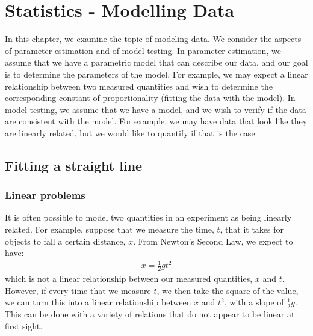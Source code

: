 %
\chapter{Statistics - Modelling Data}
\label{Chap:statModelData}
In this chapter, we examine the topic of modeling data. We consider the aspects of parameter estimation and of model testing. In parameter estimation, we assume that we have a parametric model that can describe our data, and our goal is to determine the parameters of the model. For example, we may expect a linear relationship between two measured quantities and wish to determine the corresponding constant of proportionality (fitting the data with the model). In model testing, we assume that we have a model, and we wish to verify if the data are consistent with the model. For example, we may have data that look like they are linearly related, but we would like to quantify if that is the case. 
 

\section{Fitting a straight line}
\subsection{Linear problems}
It is often possible to model two quantities in an experiment as being linearly related. For example, suppose that we measure the time, $t$, that it takes for objects to fall a certain distance, $x$. From Newton's Second Law, we expect to have:
\begin{align}
x = \frac{1}{2}gt^2
\end{align}
which is not a linear relationship between our measured quantities, $x$ and $t$. However, if every time that we measure $t$, we then take the square of the value, we can turn this into a linear relationship between $x$ and $t^2$, with a slope of $\frac{1}{2}g$. This can be done with a variety of relations that do not appear to be linear at first sight. 

